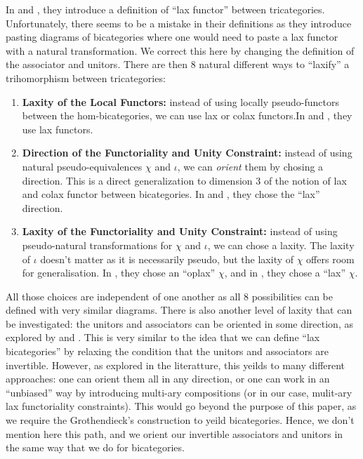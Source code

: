 \documentclass{article}
\numberwithin{equation}{section}
\theoremstyle{definition}
\theoremstyle{plain}
\begin{document}
In \cite{GARNER_2009} and \cite{gurski_2013}, they introduce a definition of ``lax functor'' between tricategories. Unfortunately, there seems to be a mistake in their definitions as they introduce pasting diagrams of bicategories where one would need to paste a lax functor with a natural transformation. We correct this here by changing the definition of the associator and unitors. There are then 8 natural different ways to ``laxify'' a trihomorphism between tricategories:
\begin{enumerate}[label = $\bullet$]
	\item \textbf{Laxity of the Local Functors:} instead of using locally pseudo-functors between the hom-bicategories, we can use lax or colax functors.In \cite{gordon1995coherence} and \cite{gurski_2013}, they use lax functors.
	\item \textbf{Direction of the Functoriality and Unity Constraint:} instead of using natural pseudo-equivalences $\chi$ and $\iota$, we can \textit{orient} them by chosing a direction. This is a direct generalization to dimension 3 of the notion of lax and colax functor between bicategories. In \cite{GARNER_2009} and \cite{gurski_2013}, they chose the ``lax'' direction.
	\item \textbf{Laxity of the Functoriality and Unity Constraint:} instead of using pseudo-natural transformations for $\chi$ and $\iota$, we can chose a laxity. The laxity of $\iota$ doesn't matter as it is necessarily pseudo, but the laxity of $\chi$ offers room for generalisation. In \cite{GARNER_2009}, they chose an ``oplax'' $\chi$, and in \cite{gurski_2013}, they chose a ``lax'' $\chi$.
\end{enumerate}
All those choices are independent of one another as all 8 possibilities can be defined with very similar diagrams. There is also another level of laxity that can be investigated: the unitors and associators can be oriented in some direction, as explored by \cite{gordon1995coherence} and \cite{gurski_2013}. This is very similar to the idea that we can define ``lax bicategories'' by relaxing the condition that the unitors and associators are invertible. However, as explored in the literatture, this yeilds to many different approaches: one can orient them all in any direction, or one can work in an ``unbiased'' way by introducing multi-ary compositions (or in our case, mulit-ary lax functoriality constraints). This would go beyond the purpose of this paper, as we require the Grothendieck's construction to yeild bicategories. Hence, we don't mention here this path, and we orient our invertible associators and unitors in the same way that we do for bicategories.
\end{document}
